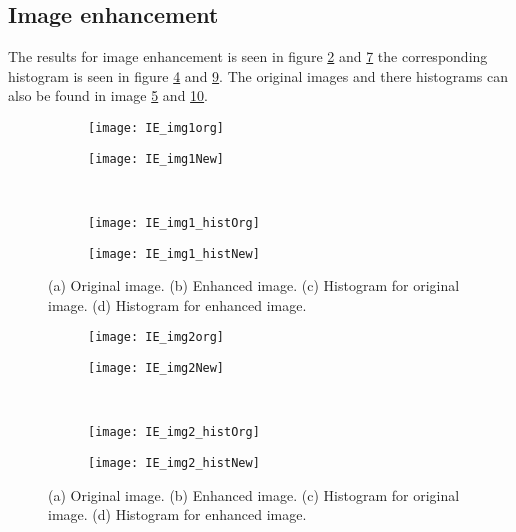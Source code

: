 \subsection{Image enhancement}
The results for image enhancement is seen in figure \ref{fig:img1new} and \ref{fig:img2new} the corresponding histogram is seen in figure \ref{fig:img1histnew} and \ref{fig:img2histnew}. The original images and there histograms can also be found in image \ref{fig:img1} and \ref{fig:img2}.
\begin{figure}[h]
	\centering
	\begin{subfigure}[b]{0.4\textwidth}
		\texttt{[image: IE\_img1org]}
		\caption{}
		\label{fig:img1org}
	\end{subfigure}
	\begin{subfigure}[b]{0.4\textwidth}
		\texttt{[image: IE\_img1New]}
		\caption{}
		\label{fig:img1new}
	\end{subfigure}
	\\
	\begin{subfigure}[b]{0.4\textwidth}
		\texttt{[image: IE\_img1\_histOrg]}
		\caption{}
		\label{fig:img1historg}
	\end{subfigure}
	\begin{subfigure}[b]{0.4\textwidth}
		\texttt{[image: IE\_img1\_histNew]}
		\caption{}
		\label{fig:img1histnew}
	\end{subfigure}
	\caption{(a) Original image. (b) Enhanced image. (c) Histogram for original image. (d) Histogram for enhanced image.}
	\label{fig:img1}
\end{figure}
\begin{figure}[h]
	\centering
	\begin{subfigure}[b]{0.4\textwidth}
		\texttt{[image: IE\_img2org]}
		\caption{}
		\label{fig:img2org}
	\end{subfigure}
	\begin{subfigure}[b]{0.4\textwidth}
		\texttt{[image: IE\_img2New]}
		\caption{}
		\label{fig:img2new}
	\end{subfigure}
	\\
	\begin{subfigure}[b]{0.4\textwidth}
		\texttt{[image: IE\_img2\_histOrg]}
		\caption{}
		\label{fig:img2historg}
	\end{subfigure}
	\begin{subfigure}[b]{0.4\textwidth}
		\texttt{[image: IE\_img2\_histNew]}
		\caption{}
		\label{fig:img2histnew}
	\end{subfigure}
	\caption{(a) Original image. (b) Enhanced image. (c) Histogram for original image. (d) Histogram for enhanced image.}
	\label{fig:img2}
\end{figure}

